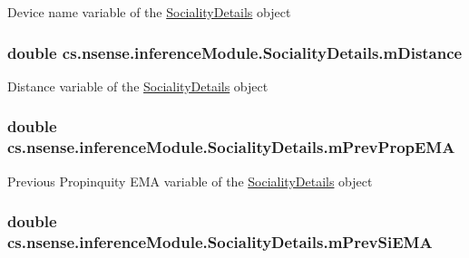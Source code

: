 Device name variable of the \hyperlink{classcs_1_1nsense_1_1inference_module_1_1_sociality_details}{Sociality\-Details} object \hypertarget{classcs_1_1nsense_1_1inference_module_1_1_sociality_details_a0ec76e4ce159025388662ad6008c2a9e}{
\subsubsection[{m\-Distance}]{\setlength{\rightskip}{0pt plus 5cm}double cs.\-nsense.\-inference\-Module.\-Sociality\-Details.\-m\-Distance}}\label{classcs_1_1nsense_1_1inference_module_1_1_sociality_details_a0ec76e4ce159025388662ad6008c2a9e}
Distance variable of the \hyperlink{classcs_1_1nsense_1_1inference_module_1_1_sociality_details}{Sociality\-Details} object \hypertarget{classcs_1_1nsense_1_1inference_module_1_1_sociality_details_a681b079820f25dddabda62d25e1f8cfe}{
\subsubsection[{m\-Prev\-Prop\-E\-M\-A}]{\setlength{\rightskip}{0pt plus 5cm}double cs.\-nsense.\-inference\-Module.\-Sociality\-Details.\-m\-Prev\-Prop\-E\-M\-A}}\label{classcs_1_1nsense_1_1inference_module_1_1_sociality_details_a681b079820f25dddabda62d25e1f8cfe}
Previous Propinquity E\-M\-A variable of the \hyperlink{classcs_1_1nsense_1_1inference_module_1_1_sociality_details}{Sociality\-Details} object \hypertarget{classcs_1_1nsense_1_1inference_module_1_1_sociality_details_acf0f989a385f0f400e31a4e26caa7bec}{
\subsubsection[{m\-Prev\-Si\-E\-M\-A}]{\setlength{\rightskip}{0pt plus 5cm}double cs.\-nsense.\-inference\-Module.\-Sociality\-Details.\-m\-Prev\-Si\-E\-M\-A}}\label{classcs_1_1nsense_1_1inference_module_1_1_sociality_details_acf0f989a385f0f400e31a4e26caa7bec}
